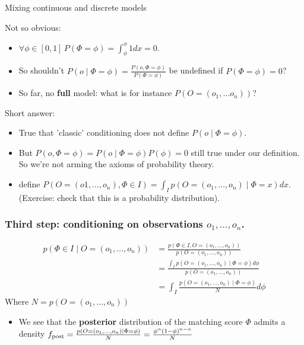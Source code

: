\documentclass{beamer}
\begin{document}
\begin{frame}{Mixing continuous and discrete models}
  \begin{alertblock}{Not so obvious:}
    \begin{itemize}
    \item $\forall \phi \in [0,1]\, P(\Phi = \phi) = \int_\phi^\phi 1 dx = 0$.
    \item So shouldn't $P(o \mid \Phi = \phi) = \frac{P(o, \Phi=\phi)}{P(\Phi=\phi)}$ be undefined if $P(\Phi = \phi)=0$?
    \item So far, no {\bf full} model: what is for instance $P(O = (o_1,\dots o_n))$?
    \end{itemize}
  \end{alertblock}

  \begin{block}{Short answer:}
    \begin{itemize}
    \item True that 'classic' conditioning does not define $P(o \mid \Phi = \phi)$.  
    \item But $P(o, \Phi = \phi) = P(o \mid \Phi = \phi)P(\phi) = 0$ still true under our definition. So we're not arming the axioms of probability theory.
    \item define $P(O = (o1, \dots, o_n), \Phi \in I) = \int_I p(O = (o_1, \dots, o_n) \mid \Phi = x) dx$. (Exercise: check that this is a probability distribution).
    \end{itemize}
  \end{block}
\end{frame}


\begin{frame}
  \frametitle{Third step: conditioning on observations $o_1, \dots, o_n$.}
  
  \[\begin{aligned}
  p(\Phi \in I \mid O=(o_1, \dots, o_n)) &= \frac{p(\Phi \in I, O=(o_1, \dots, o_n))}{p(O=(o_1, \dots, o_n))}\\
  &= \frac{\int_I p(O = (o_1, \dots, o_n) \mid \Phi = \phi) d\phi}{p(O=(o_1, \dots, o_n))}\\
  &= \int_I \frac{p(O = (o_1, \dots, o_n) \mid \Phi = \phi)}{N} d\phi 
    \end{aligned}\]
  Where $N = p(O=(o_1, \dots, o_n))$ %

  \begin{itemize}
  \item We see that the {\bf posterior} distribution of the matching score $\Phi$ admits a density $f_{\textnormal{post}} = \frac{p(O = (o_1, \dots, o_n) \mid \Phi = \phi)}{N} = \frac{\phi^{\alpha}(1-\phi)^{n-\alpha}}{N}$
  \end{itemize}
\end{frame}
\end{document}

